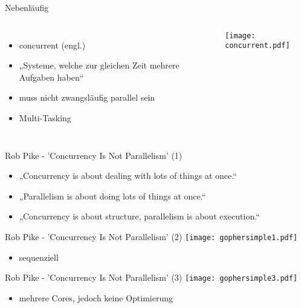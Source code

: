 \documentclass[compress]{beamer}
\begin{document}
  \begin{frame}{Nebenläufig}
    \begin{columns}[c]
      \begin{itemize}
        \item concurrent (engl.)
        \item „Systeme, welche zur gleichen Zeit mehrere \alert{Aufgaben} haben“
        \item muss nicht zwangsläufig parallel sein
        \item Multi-Tasking
      \end{itemize}
      \texttt{[image: concurrent.pdf]}
    \end{columns}
  \end{frame}
  
  \note[itemize]{
  }

  \begin{frame}{Rob Pike - 'Concurrency Is Not Parallelism' (1)}
    \begin{itemize}
      \item „Concurrency is about dealing with lots of things at once.“
      \item „Parallelism is about doing lots of things at once.“
      \item „Concurrency is about structure, parallelism is about execution.“
    \end{itemize}
  \end{frame}


  \begin{frame}{Rob Pike - 'Concurrency Is Not Parallelism' (2)}
    \texttt{[image: gophersimple1.pdf]}
    \begin{itemize}
      \item sequenziell
    \end{itemize}
  \end{frame}

  \begin{frame}{Rob Pike - 'Concurrency Is Not Parallelism' (3)}
    \texttt{[image: gophersimple3.pdf]}
    \begin{itemize}
      \item mehrere Cores, jedoch keine Optimierung
    \end{itemize}
  \end{frame}
\end{document}
